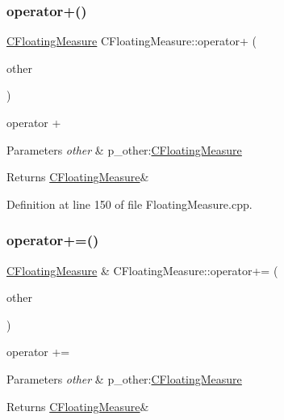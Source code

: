 \subsubsection{\texorpdfstring{operator+()}{operator+()}}
{\footnotesize\ttfamily \hyperlink{classCFloatingMeasure}{C\+Floating\+Measure} C\+Floating\+Measure\+::operator+ (\begin{DoxyParamCaption}\item[{const \hyperlink{classCFloatingMeasure}{C\+Floating\+Measure} \&}]{other }\end{DoxyParamCaption})}



operator + 


\begin{DoxyParams}{Parameters}
{\em other} & p\+\_\+other\+:\hyperlink{classCFloatingMeasure}{C\+Floating\+Measure} \\
\hline
\end{DoxyParams}
\begin{DoxyReturn}{Returns}
\hyperlink{classCFloatingMeasure}{C\+Floating\+Measure}\& 
\end{DoxyReturn}


Definition at line 150 of file Floating\+Measure.\+cpp.

\mbox{\label{classCFloatingMeasure_a40f0ec4cb155856efed8db28c7c8fa3e}} 
\subsubsection{\texorpdfstring{operator+=()}{operator+=()}}
{\footnotesize\ttfamily \hyperlink{classCFloatingMeasure}{C\+Floating\+Measure} \& C\+Floating\+Measure\+::operator+= (\begin{DoxyParamCaption}\item[{const \hyperlink{classCFloatingMeasure}{C\+Floating\+Measure} \&}]{other }\end{DoxyParamCaption})}



operator += 


\begin{DoxyParams}{Parameters}
{\em other} & p\+\_\+other\+:\hyperlink{classCFloatingMeasure}{C\+Floating\+Measure} \\
\hline
\end{DoxyParams}
\begin{DoxyReturn}{Returns}
\hyperlink{classCFloatingMeasure}{C\+Floating\+Measure}\& 
\end{DoxyReturn}


